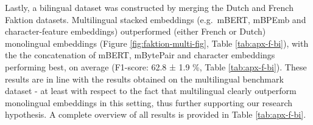 \documentclass[12pt,a4paper,]{book}
\begin{document}
Lastly, a bilingual dataset was constructed by merging the Dutch and French Faktion datasets. Multilingual stacked embeddings (e.g.~mBERT, mBPEmb and character-feature embeddings) outperformed (either French or Dutch) monolingual embeddings (Figure \ref{fig:faktion-multi-fig}, Table \ref{tab:apx-f-bi}), with the the concatenation of mBERT, mBytePair and character embeddings performing best, on average (F1-score: 62.8 ± 1.9 \%, Table \ref{tab:apx-f-bi}). These results are in line with the results obtained on the multilingual benchmark dataset - at least with respect to the fact that multilingual clearly outperform monolingual embeddings in this setting, thus further supporting our research hypothesis. A complete overview of all results is provided in Table \ref{tab:apx-f-bi}.

\begin{table}


\end{table}
\end{document}
